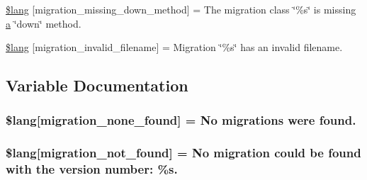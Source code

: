 \begin{DoxyCompactItemize}
\item 
\hyperlink{_admin_2system_2language_2english_2migration__lang_8php_a6e835ce0b327b8ea1df42bfc7a59f1cd}{\$lang} \mbox{[}\textquotesingle{}migration\+\_\+missing\+\_\+down\+\_\+method\textquotesingle{}\mbox{]} = \textquotesingle{}The migration class \char`\"{}\%s\char`\"{} is missing \hyperlink{_admin_2assets_2js_2bootstrap_8min_8js_a1f5870dcf487187f13d5fd328ed9e6e7}{a} \char`\"{}down\char`\"{} method.\textquotesingle{}
\item 
\hyperlink{_admin_2system_2language_2english_2migration__lang_8php_a75ef7572f25674e4dd1e36a0d61080fa}{\$lang} \mbox{[}\textquotesingle{}migration\+\_\+invalid\+\_\+filename\textquotesingle{}\mbox{]} = \textquotesingle{}Migration \char`\"{}\%s\char`\"{} has an invalid filename.\textquotesingle{}
\end{DoxyCompactItemize}


\subsection{Variable Documentation}
\hypertarget{_admin_2system_2language_2english_2migration__lang_8php_affa6337f0973de810b3c61491deae6b1}{}
\subsubsection[{\$lang}]{\setlength{\rightskip}{0pt plus 5cm}\$lang\mbox{[}\textquotesingle{}migration\+\_\+none\+\_\+found\textquotesingle{}\mbox{]} = \textquotesingle{}No migrations were found.\textquotesingle{}}\label{_admin_2system_2language_2english_2migration__lang_8php_affa6337f0973de810b3c61491deae6b1}
\hypertarget{_admin_2system_2language_2english_2migration__lang_8php_a92dd777422d70950993d43f4d0c31b1b}{}
\subsubsection[{\$lang}]{\setlength{\rightskip}{0pt plus 5cm}\$lang\mbox{[}\textquotesingle{}migration\+\_\+not\+\_\+found\textquotesingle{}\mbox{]} = \textquotesingle{}No migration could be found with the {\bf version} number\+: \%s.\textquotesingle{}}\label{_admin_2system_2language_2english_2migration__lang_8php_a92dd777422d70950993d43f4d0c31b1b}
\hypertarget{_admin_2system_2language_2english_2migration__lang_8php_ab1f43d98bc1365f4b753d783a8802697}{}
